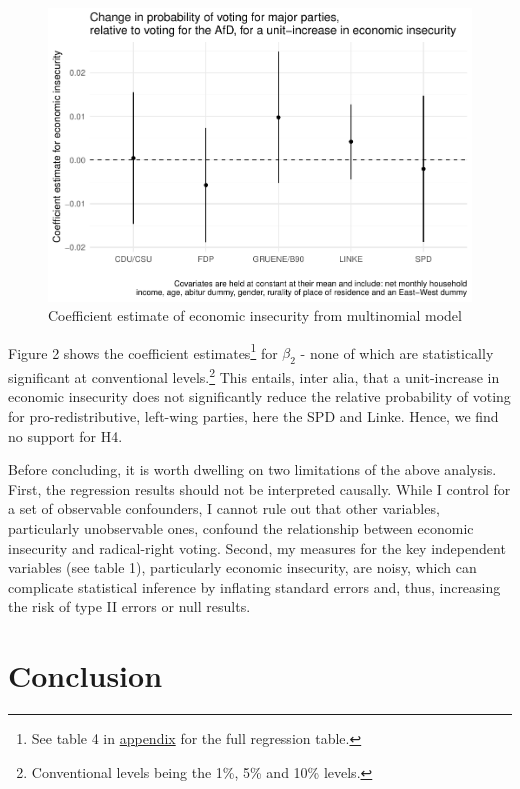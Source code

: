 \documentclass[
]{article}
\begin{document}
\begin{figure}
\centering
\includegraphics{AVCD_Draft_Assignment_Pruned_files/figure-latex/multinomial-model-plot-1.pdf}
\caption{Coefficient estimate of economic insecurity from multinomial
model}
\end{figure}

Figure 2 shows the coefficient estimates\footnote{See table 4 in
  \protect\hyperlink{appendix}{appendix} for the full regression table.}
for \(\beta_{2}\) - none of which are statistically significant at
conventional levels.\footnote{Conventional levels being the 1\%, 5\% and
  10\% levels.} This entails, inter alia, that a unit-increase in
economic insecurity does not significantly reduce the relative
probability of voting for pro-redistributive, left-wing parties, here
the SPD and Linke. Hence, we find no support for H4.

Before concluding, it is worth dwelling on two limitations of the above
analysis. First, the regression results should not be interpreted
causally. While I control for a set of observable confounders, I cannot
rule out that other variables, particularly unobservable ones, confound
the relationship between economic insecurity and radical-right voting.
Second, my measures for the key independent variables (see table 1),
particularly economic insecurity, are noisy, which can complicate
statistical inference by inflating standard errors and, thus, increasing
the risk of type II errors or null results.

\hypertarget{conclusion}{%
\section{Conclusion}\label{conclusion}}
\end{document}

